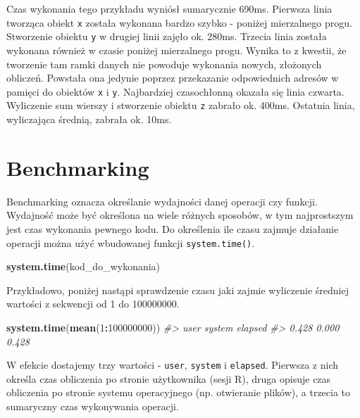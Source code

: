 \documentclass[paper=6in:9in,pagesize=pdftex,headinclude=on,footinclude=on,10pt]{scrbook}
\newenvironment{Shaded}{\begin{snugshade}}{\end{snugshade}}
\newcommand{\CommentTok}[1]{\textcolor[rgb]{0.56,0.35,0.01}{\textit{#1}}}
\newcommand{\DecValTok}[1]{\textcolor[rgb]{0.00,0.00,0.81}{#1}}
\newcommand{\KeywordTok}[1]{\textcolor[rgb]{0.13,0.29,0.53}{\textbf{#1}}}
\newcommand{\NormalTok}[1]{#1}
\newcommand{\OperatorTok}[1]{\textcolor[rgb]{0.81,0.36,0.00}{\textbf{#1}}}
\begin{document}
Czas wykonania tego przykładu wyniósł sumarycznie 690ms.
Pierwsza linia tworząca obiekt \texttt{x} została wykonana bardzo szybko - poniżej mierzalnego progu.
Stworzenie obiektu \texttt{y} w drugiej linii zajęło ok. 280ms.
Trzecia linia została wykonana również w czasie poniżej mierzalnego progu.
Wynika to z kwestii, że tworzenie tam ramki danych nie powoduje wykonania nowych, złożonych obliczeń.
Powstała ona jedynie poprzez przekazanie odpowiednich adresów w pamięci do obiektów \texttt{x} i \texttt{y}.
Najbardziej czasochłonną okazała się linia czwarta.
Wyliczenie sum wierszy i stworzenie obiektu \texttt{z} zabrało ok. 400ms.
Ostatnia linia, wyliczająca średnią, zabrała ok. 10ms.

\hypertarget{benchmarking}{%
\section{Benchmarking}\label{benchmarking}}

Benchmarking oznacza określanie wydajności danej operacji czy funkcji.
Wydajność może być określona na wiele różnych sposobów, w tym najprostszym jest czas wykonania pewnego kodu.
Do określenia ile czasu zajmuje działanie operacji można użyć wbudowanej funkcji \texttt{system.time()}.

\begin{Shaded}
\begin{Highlighting}[]
\KeywordTok{system.time}\NormalTok{(kod_do_wykonania)}
\end{Highlighting}
\end{Shaded}

Przykładowo, poniżej nastąpi sprawdzenie czasu jaki zajmie wyliczenie średniej wartości z sekwencji od 1 do 100000000.

\begin{Shaded}
\begin{Highlighting}[]
\KeywordTok{system.time}\NormalTok{(}\KeywordTok{mean}\NormalTok{(}\DecValTok{1}\OperatorTok{:}\DecValTok{100000000}\NormalTok{))}
\CommentTok{#>    user  system elapsed }
\CommentTok{#>   0.428   0.000   0.428}
\end{Highlighting}
\end{Shaded}

W efekcie dostajemy trzy wartości - \texttt{user}, \texttt{system} i \texttt{elapsed}. Pierwsza z nich określa czas obliczenia po stronie użytkownika (sesji R), druga opisuje czas obliczenia po stronie systemu operacyjnego (np. otwieranie plików), a trzecia to sumaryczny czas wykonywania operacji.
\end{document}

